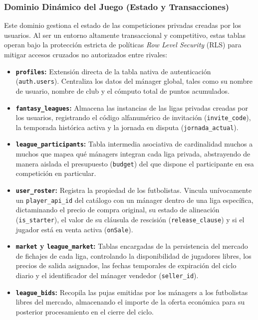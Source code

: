 \subsubsection{Dominio Dinámico del Juego (Estado y Transacciones)}
Este dominio gestiona el estado de las competiciones privadas creadas por los usuarios. Al ser un entorno altamente transaccional y competitivo, estas tablas operan bajo la protección estricta de políticas \textit{Row Level Security} (RLS) para mitigar accesos cruzados no autorizados entre rivales:

\begin{itemize}
    \item \textbf{\texttt{profiles}:} Extensión directa de la tabla nativa de autenticación (\texttt{auth.users}). Centraliza los datos del mánager global, tales como su nombre de usuario, nombre de club y el cómputo total de puntos acumulados.
    \item \textbf{\texttt{fantasy\_leagues}:} Almacena las instancias de las ligas privadas creadas por los usuarios, registrando el código alfanumérico de invitación (\texttt{invite\_code}), la temporada histórica activa y la jornada en disputa (\texttt{jornada\_actual}).
    \item \textbf{\texttt{league\_participants}:} Tabla intermedia asociativa de cardinalidad muchos a muchos que mapea qué mánagers integran cada liga privada, abstrayendo de manera aislada el presupuesto (\texttt{budget}) del que dispone el participante en esa competición en particular.
    \item \textbf{\texttt{user\_roster}:} Registra la propiedad de los futbolistas. Vincula unívocamente un \texttt{player\_api\_id} del catálogo con un mánager dentro de una liga específica, dictaminando el precio de compra original, su estado de alineación (\texttt{is\_starter}), el valor de su cláusula de rescisión (\texttt{release\_clause}) y si el jugador está en venta activa (\texttt{onSale}).
    \item \textbf{\texttt{market} y \texttt{league\_market}:} Tablas encargadas de la persistencia del mercado de fichajes de cada liga, controlando la disponibilidad de jugadores libres, los precios de salida asignados, las fechas temporales de expiración del ciclo diario y el identificador del mánager vendedor (\texttt{seller\_id}).
    \item \textbf{\texttt{league\_bids}:} Recopila las pujas emitidas por los mánagers a los futbolistas libres del mercado, almacenando el importe de la oferta económica para su posterior procesamiento en el cierre del ciclo.

\end{itemize}
